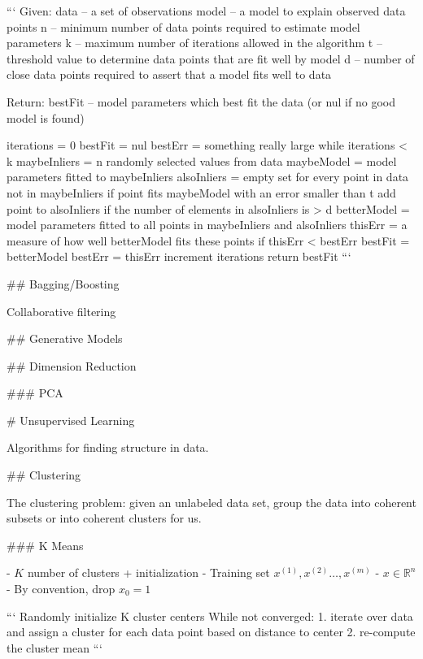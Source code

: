 ```
Given:
    data – a set of observations
    model – a model to explain observed data points
    n – minimum number of data points required to estimate model parameters
    k – maximum number of iterations allowed in the algorithm
    t – threshold value to determine data points that are fit well by model 
    d – number of close data points required to assert that a model fits well to data

Return:
    bestFit – model parameters which best fit the data (or nul if no good model is found)

iterations = 0
bestFit = nul
bestErr = something really large
while iterations < k {
    maybeInliers = n randomly selected values from data
    maybeModel = model parameters fitted to maybeInliers
    alsoInliers = empty set
    for every point in data not in maybeInliers {
        if point fits maybeModel with an error smaller than t
             add point to alsoInliers
    }
    if the number of elements in alsoInliers is > d {
        betterModel = model parameters fitted to all points in maybeInliers and alsoInliers
        thisErr = a measure of how well betterModel fits these points
        if thisErr < bestErr {
            bestFit = betterModel
            bestErr = thisErr
        }
    }
    increment iterations
}
return bestFit
```



## Bagging/Boosting

Collaborative filtering

## Generative Models

## Dimension Reduction

### PCA

# Unsupervised Learning

Algorithms for finding structure in data.

## Clustering

The clustering problem: given an unlabeled data set, group the data into coherent  subsets or into coherent clusters for us.

### K Means

- $K$ number of clusters + initialization
- Training set ${x^{(1)},x^{(2)}\dots,x^{(m)}}$
- $x\in\mathbb{R}^n$
- By convention, drop $x_0=1$

```
Randomly initialize K cluster centers
While not converged:
1. iterate over data and assign a cluster for each data point based on distance to center
2. re-compute the cluster mean
```

